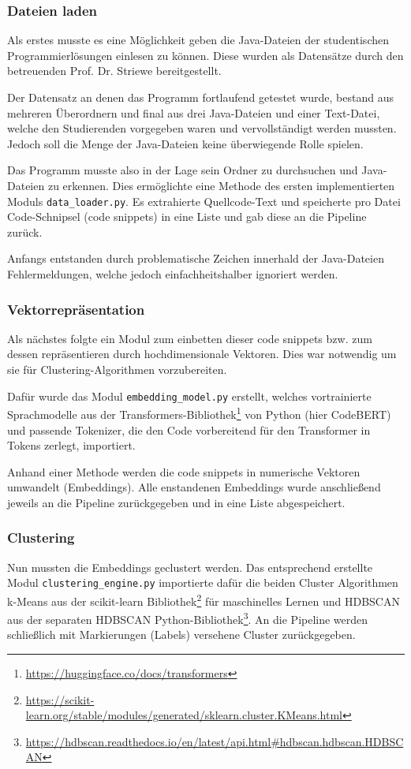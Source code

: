 \subsubsection*{Dateien laden}
Als erstes musste es eine Möglichkeit geben die Java-Dateien der studentischen Programmierlösungen einlesen zu können. Diese wurden als Datensätze durch den betreuenden Prof. Dr. Striewe bereitgestellt.

Der Datensatz an denen das Programm fortlaufend getestet wurde, bestand aus mehreren Überordnern und final aus drei Java-Dateien und einer Text-Datei, welche den Studierenden vorgegeben waren und vervollständigt werden mussten. Jedoch soll die Menge der Java-Dateien keine überwiegende Rolle spielen.

Das Programm musste also in der Lage sein Ordner zu durchsuchen und Java-Dateien zu erkennen. Dies ermöglichte eine Methode des ersten implementierten Moduls \texttt{data\_loader.py}. Es extrahierte Quellcode-Text und speicherte pro Datei Code-Schnipsel (code snippets) in eine Liste und gab diese an die Pipeline zurück.

Anfangs entstanden durch problematische Zeichen innerhald der Java-Dateien Fehlermeldungen, welche jedoch einfachheitshalber ignoriert werden.


\subsubsection*{Vektorrepräsentation}
Als nächstes folgte ein Modul zum einbetten dieser code snippets bzw. zum dessen repräsentieren durch hochdimensionale Vektoren. Dies war notwendig um sie für Clustering-Algorithmen vorzubereiten. 

Dafür wurde das Modul \texttt{embedding\_model.py} erstellt, welches vortrainierte Sprachmodelle aus der Transformers-Bibliothek\footnote{\url{https://huggingface.co/docs/transformers}} von Python (hier CodeBERT) und passende Tokenizer, die den Code vorbereitend für den Transformer in Tokens zerlegt, importiert.

Anhand einer Methode werden die code snippets in numerische Vektoren umwandelt (Embeddings). Alle enstandenen Embeddings wurde anschließend jeweils an die Pipeline zurückgegeben und in eine Liste abgespeichert.


\subsubsection*{Clustering}
Nun mussten die Embeddings geclustert werden. Das entsprechend erstellte Modul \texttt{clustering\_engine.py} importierte dafür die beiden Cluster Algorithmen k-Means aus der scikit-learn Bibliothek\footnote{\url{https://scikit-learn.org/stable/modules/generated/sklearn.cluster.KMeans.html}} für maschinelles Lernen und HDBSCAN aus der separaten HDBSCAN Python-Bibliothek\footnote{\url{https://hdbscan.readthedocs.io/en/latest/api.html\#hdbscan.hdbscan.HDBSCAN}}. An die Pipeline werden schließlich mit Markierungen (Labels) versehene Cluster zurückgegeben.


